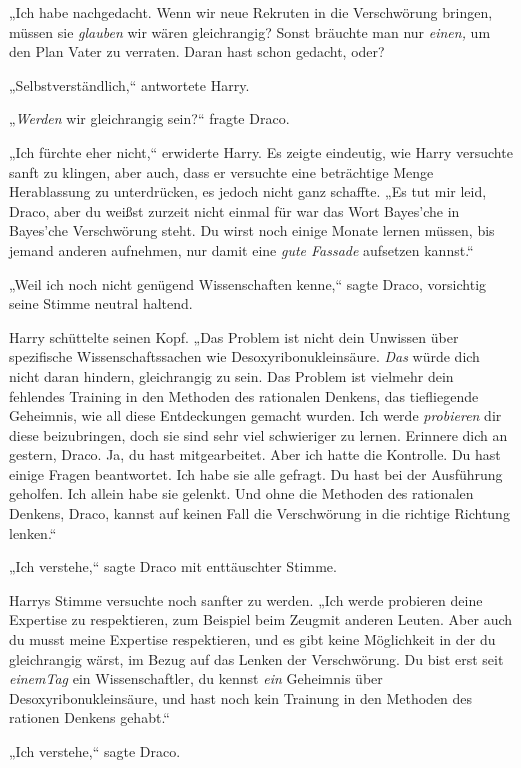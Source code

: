 {„Ich habe nachgedacht. Wenn wir neue Rekruten in die Verschwörung bringen, müssen sie \emph{glauben} wir wären gleichrangig? Sonst bräuchte man nur \emph{einen,} um den Plan Vater zu verraten. Daran hast schon gedacht, oder?

„Selbstverständlich,“ antwortete Harry.

„\emph{Werden} wir gleichrangig sein?“ fragte Draco.

„Ich fürchte eher nicht,“ erwiderte Harry. Es zeigte eindeutig, wie Harry versuchte sanft zu klingen, aber auch, dass er versuchte eine beträchtige Menge Herablassung zu unterdrücken, es jedoch nicht ganz schaffte. „Es tut mir leid, Draco, aber du weißst zurzeit nicht einmal für war das Wort Bayes'che in Bayes'che Verschwörung steht. Du wirst noch einige Monate lernen müssen, bis jemand anderen aufnehmen, nur damit eine \emph{gute Fassade} aufsetzen kannst.“

„Weil ich noch nicht genügend Wissenschaften kenne,“ sagte Draco, vorsichtig seine Stimme neutral haltend.

Harry schüttelte seinen Kopf. „Das Problem ist nicht dein Unwissen über spezifische Wissenschaftssachen wie Desoxyribonukleinsäure. \emph{Das} würde dich nicht daran hindern, gleichrangig zu sein. Das Problem ist vielmehr dein fehlendes Training in den Methoden des rationalen Denkens, das tiefliegende Geheimnis, wie all diese Entdeckungen gemacht wurden. Ich werde \emph{probieren} dir diese beizubringen, doch sie sind sehr viel schwieriger zu lernen. Erinnere dich an gestern, Draco. Ja, du hast mitgearbeitet. Aber ich hatte die Kontrolle. Du hast einige Fragen beantwortet. Ich habe sie alle gefragt. Du hast bei der Ausführung geholfen. Ich allein habe sie gelenkt. Und ohne die Methoden des rationalen Denkens, Draco, kannst auf keinen Fall die Verschwörung in die richtige Richtung lenken.“

„Ich verstehe,“ sagte Draco mit enttäuschter Stimme.

Harrys Stimme versuchte noch sanfter zu werden. „Ich werde probieren deine Expertise zu respektieren, zum Beispiel beim Zeugmit anderen Leuten. Aber auch du musst meine Expertise respektieren, und es gibt keine Möglichkeit in der du gleichrangig wärst, im Bezug auf das Lenken der Verschwörung. Du bist erst seit \emph{einemTag} ein Wissenschaftler, du kennst \emph{ein} Geheimnis über Desoxyribonukleinsäure, und hast noch kein Trainung in den Methoden des rationen Denkens gehabt.“

„Ich verstehe,“ sagte Draco.

}
